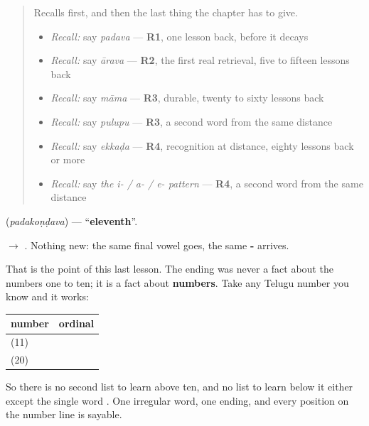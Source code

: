 \begin{quote}
Recalls first, and then the last thing the chapter has to give.

\begin{itemize}
\raggedright
  \item \emph{Recall:} say \emph{padava} — \textbf{R1}, one lesson back, before it decays
  \item \emph{Recall:} say \emph{ārava} — \textbf{R2}, the first real retrieval, five to fifteen lessons back
  \item \emph{Recall:} say \emph{māma} — \textbf{R3}, durable, twenty to sixty lessons back
  \item \emph{Recall:} say \emph{pulupu} — \textbf{R3}, a second word from the same distance
  \item \emph{Recall:} say \emph{ekkaḍa} — \textbf{R4}, recognition at distance, eighty lessons back or more
  \item \emph{Recall:} say \emph{the i- / a- / e- pattern} — \textbf{R4}, a second word from the same distance
\end{itemize}
\end{quote}

\begin{grammarlens}[title={Grammar Lens: every number you have, and every one you meet}]
\textbf{} (\emph{padakoṇḍava}) — \textquotedblleft{}\textbf{eleventh}\textquotedblright{}.

\textbf{} $\to$ \textbf{}. Nothing new: the same final vowel goes, the same \textbf{-} arrives.

That is the point of this last lesson. The ending was never a fact about the numbers one to ten; it is a fact about \textbf{numbers}. Take any Telugu number you know and it works:

\noindent
\begin{tabularx}{\linewidth}{@{}>{\raggedright\arraybackslash}X>{\raggedright\arraybackslash}X@{}}
\toprule
\textbf{number} & \textbf{ordinal} \\
\midrule
\textbf{\te{పదకొండు}} (11) & \textbf{\te{పదకొండవ}} \\
\textbf{\te{ఇరవై}} (20) & \textbf{\te{ఇరవయ్యవ}} \\
\bottomrule
\end{tabularx}

So there is no second list to learn above ten, and no list to learn below it either except the single word \textbf{}. One irregular word, one ending, and every position on the number line is sayable.
\end{grammarlens}

